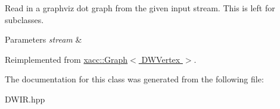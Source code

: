 Read in a graphviz dot graph from the given input stream. This is left for subclasses.


\begin{DoxyParams}{Parameters}
{\em stream} & \\
\hline
\end{DoxyParams}


Reimplemented from \hyperlink{a01211_abdd3e67dc08c223821d809bc8914164a}{xacc\+::\+Graph$<$ D\+W\+Vertex $>$}.



The documentation for this class was generated from the following file\+:\begin{DoxyCompactItemize}
\item 
D\+W\+I\+R.\+hpp\end{DoxyCompactItemize}

